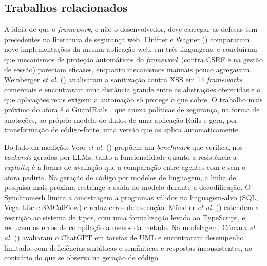 \documentclass[a4paper,12pt]{article}
\newcommand{\estr}[1]{\textit{#1}}
\begin{document}
\subsection{Trabalhos relacionados}\label{sec:relacionados}

A ideia de que o \estr{framework}, e não o desenvolvedor, deve carregar as defesas tem precedentes na literatura de segurança web. Finifter e Wagner (\citeyear{finifter2011}) compararam nove implementações da mesma aplicação web, em três linguagens, e concluíram que mecanismos de proteção automáticos do \estr{framework} (contra CSRF e na gestão de sessão) pareciam eficazes, enquanto mecanismos manuais pouco agregavam. Weinberger \textit{et al.} (\citeyear{weinberger2011}) analisaram a sanitização contra XSS em 14 \estr{frameworks} comerciais e encontraram uma distância grande entre as abstrações oferecidas e o que aplicações reais exigem: a automação só protege o que cobre. O trabalho mais próximo do afora é o GuardRails \citep{burket2011}, que anexa políticas de segurança, na forma de anotações, ao próprio modelo de dados de uma aplicação Rails e gera, por transformação de código-fonte, uma versão que as aplica automaticamente.

Do lado da medição, Vero \textit{et al.} (\citeyear{vero2025}) propõem um \estr{benchmark} que verifica, nos \estr{backends} gerados por LLMs, tanto a funcionalidade quanto a resistência a \estr{exploits}; é a forma de avaliação que a comparação entre agentes com e sem o afora pediria. Na geração de código por modelos de linguagem, a linha de pesquisa mais próxima restringe a saída do modelo durante a decodificação. O Synchromesh \citep{poesia2022} limita a amostragem a programas válidos na linguagem-alvo (SQL, Vega-Lite e SMCalFlow) e reduz erros de execução. Mündler \textit{et al.} (\citeyear{mundler2025}) estendem a restrição ao sistema de tipos, com uma formalização levada ao TypeScript, e reduzem os erros de compilação a menos da metade. Na modelagem, Cámara \textit{et al.} (\citeyear{camara2023}) avaliaram o ChatGPT em tarefas de UML e encontraram desempenho limitado, com deficiências sintáticas e semânticas e respostas inconsistentes, ao contrário do que se observa na geração de código.
\end{document}
